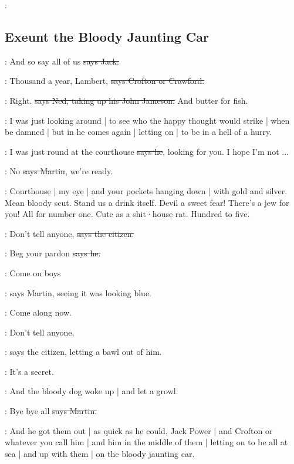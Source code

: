 \All:


\subsection*{Exeunt the Bloody Jaunting Car}

\power:
And so say all of us
\sout{says Jack.}

\crofton:
Thousand a year,
Lambert,
\sout{says Crofton or Crawford.}

\lambert:
Right.
\sout{says Ned,
taking up his John Jameson.}
And butter for fish.

\Nq:
I was just looking around |
to see who the happy thought would strike |
when be damned |
but in he comes again |
letting on |
to be in a hell of a hurry.


\Bloom:
I was just round at the courthouse
\sout{says he},
looking for you.
I hope I'm not ...

\cunningham:
No
\sout{says Martin},
we're ready.

\Nq:
Courthouse |
my eye |
and your pockets hanging down |
with gold and silver.
Mean bloody scut.
Stand us a drink itself.
Devil a sweet fear!
There's a jew for you!
All for number one.
Cute as a shit·house rat.
Hundred to five.

\citizen:
Don't tell anyone,
\sout{says the citizen.}

\Bloom:
Beg your pardon
\sout{says he.}

\cunningham:
Come on boys

\Nq:
says Martin,
seeing it was looking blue.

\cunningham:
Come along now.

\citizen:
Don't tell anyone,

\Nq:
says the citizen,
letting a bawl out of him.

\citizen:
It's a secret.

\Nq:
And the bloody dog woke up |
and let a growl.

\cunningham:
Bye bye all
\sout{says Martin.}

\Nq:
And he got them out |
as quick as he could,
Jack Power |
and Crofton or whatever you call him |
and him in the middle of them |
letting on to be all at sea
 |
and up with them |
on the bloody jaunting car.

